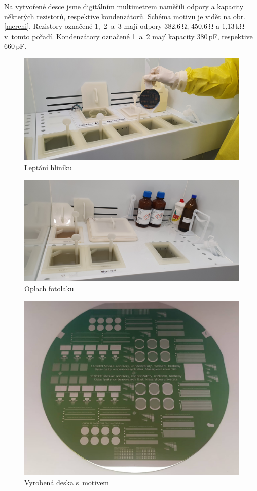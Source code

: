 \documentclass[a4paper,12pt]{article}
\begin{document}
Na vytvořené desce jsme digitálním multimetrem naměřili odpory a kapacity 
některých rezistorů, respektive kondenzátorů. Schéma motivu je vidět na obr. 
\ref{mereni}. Rezistory označené 1,~2~a~3 mají odpory 382,6\,\si{\ohm}, 
450,6\,\si{\ohm} a 1,13\,\si{\kilo\ohm} v~tomto pořadí. Kondenzátory označené 1~a~2 mají kapacity 380\,\si{\pico\farad}, respektive 660\,\si{\pico\farad}.


\begin{figure}[h!]
	\centering
	\includegraphics[width=130mm]{8Aletch.jpg}
	\caption{Leptání hliníku}
	\label{8Aletch}
\end{figure}

\begin{figure}[h!]
	\centering
	\includegraphics[width=130mm]{11oplach.jpg}
	\caption{Oplach fotolaku}
	\label{11oplach}
\end{figure}

\newpage
\begin{figure}[h!]
	\centering
	\includegraphics[width=130mm]{deska.jpg}
	\caption{Vyrobená deska s~motivem}
	\label{deska}
\end{figure}
\end{document}
